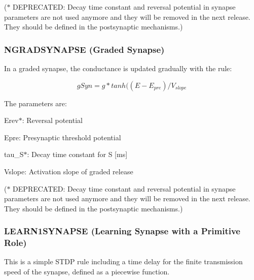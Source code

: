 ($\ast$ D\+E\+P\+R\+E\+C\+A\+T\+E\+D\+: Decay time constant and reversal potential in synapse parameters are not used anymore and they will be removed in the next release. They should be defined in the postsynaptic mechanisms.)\hypertarget{UserManual_sec_sect32}{}\subsubsection{N\+G\+R\+A\+D\+S\+Y\+N\+A\+P\+S\+E (\+Graded Synapse)}\label{UserManual_sec_sect32}
In a graded synapse, the conductance is updated gradually with the rule\+:

\[ gSyn= g * tanh((E - E_{pre}) / V_{slope} \]

The parameters are\+:
\begin{DoxyItemize}
\item {\ttfamily Erev$\ast$}\+: Reversal potential
\item {\ttfamily Epre\+:} Presynaptic threshold potential
\item {\ttfamily tau\+\_\+\+S$\ast$}\+: Decay time constant for S \mbox{[}ms\mbox{]}
\item {\ttfamily Vslope\+:} Activation slope of graded release
\end{DoxyItemize}

($\ast$ D\+E\+P\+R\+E\+C\+A\+T\+E\+D\+: Decay time constant and reversal potential in synapse parameters are not used anymore and they will be removed in the next release. They should be defined in the postsynaptic mechanisms.)\hypertarget{UserManual_sec_sect33}{}\subsubsection{L\+E\+A\+R\+N1\+S\+Y\+N\+A\+P\+S\+E (\+Learning Synapse with a Primitive Role)}\label{UserManual_sec_sect33}
This is a simple S\+T\+D\+P rule including a time delay for the finite transmission speed of the synapse, defined as a piecewise function.

